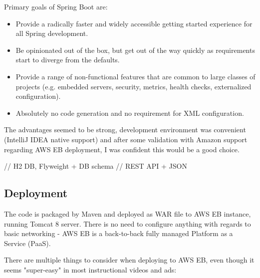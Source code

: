 Primary goals of Spring Boot are\cite{spring-boot-doc}:

\begin{itemize}
	\item Provide a radically faster and widely accessible getting started experience for all Spring development.
	\item Be opinionated out of the box, but get out of the way quickly as requirements start to diverge from the defaults.
	\item Provide a range of non-functional features that are common to large classes of projects (e.g. embedded servers, security, metrics, health checks, externalized configuration).
	\item Absolutely no code generation and no requirement for XML configuration.
\end{itemize}

The advantages seemed to be strong, development environment was convenient (IntelliJ IDEA native support) and after some validation with Amazon support regarding AWS EB deployment, I was confident this would be a good choice.

// H2 DB, Flyweight + DB schema
// REST API + JSON

\subsection{Deployment}

The code is packaged by Maven and deployed as WAR file to AWS EB instance, running Tomcat 8 server. There is no need to configure anything with regards to basic networking - AWS EB is a back-to-back fully managed Platform as a Service (PaaS).

There are multiple things to consider when deploying to AWS EB, even though it seems "super-easy" in most instructional videos and ads:

